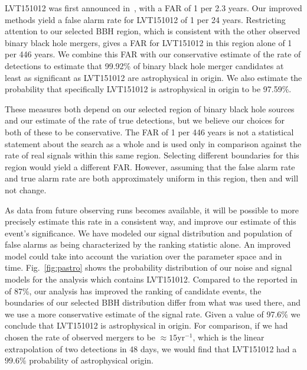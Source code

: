 LVT151012 was first announced in~\cite{TheLIGOScientific:2016qqj}, with a FAR
of 1 per 2.3 years. Our improved methods yield a false alarm rate for LVT151012
of 1 per 24 years. Restricting attention to our selected BBH region, which is
consistent with the other observed binary black hole mergers, gives a FAR for
LVT151012 in this region alone of 1 per 446 years. We combine this FAR  with
our conservative estimate of the rate of detections to estimate that 99.92\% of
binary black hole merger candidates at least as significant as LVT151012 are
astrophysical in origin. We also estimate the probability that specifically
LVT151012 is astrophysical in origin to be 97.59$\%$.

These measures both depend on our selected region of binary black hole sources
and our estimate of the rate of true detections, but we believe our choices for
both of these to be conservative. The FAR of 1 per 446 years is not a
statistical statement about the search as a whole and is used only in
comparison against the rate of real signals within this same region. Selecting
different boundaries for this region would yield a different FAR. However,
assuming that the false alarm rate and true alarm rate are both approximately
uniform in this region, then \pastro{} and \tdr{} will not change.


As data from future observing runs becomes available, it will be possible to more precisely estimate this rate in a consistent way, and improve our estimate of this event's significance.  We have modeled our signal distribution and population of false alarms as being characterized by the ranking statistic \rankingstat{} alone. An improved model could take into account the variation over the parameter space and in time. Fig.~\ref{fig:pastro} shows the probability distribution of our noise and signal models for the analysis which contains LVT151012. Compared to the \pastro{} reported in~\cite{TheLIGOScientific:2016pea} of 87\%, our analysis has improved the ranking of candidate events, the boundaries of our selected BBH distribution differ from what was used there, and we use a more conservative estimate of the signal rate. Given a \pastro{} value of 97.6$\%$ we conclude that LVT151012 is astrophysical in origin. For comparison, if we had chosen the rate of observed mergers to be $\approx 15 \mathrm{yr}^{-1}$, which is the linear extrapolation of two detections in 48 days, we would find that LVT151012 had a $99.6\%$ probability of astrophysical origin.

